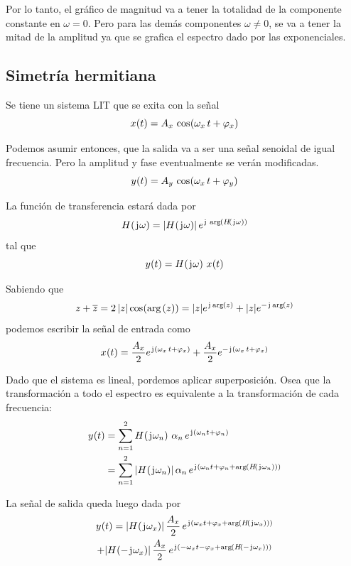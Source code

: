 Por lo tanto, el gráfico de magnitud va a tener la totalidad de la componente constante en $\omega = 0$.
Pero para las demás componentes $\omega \neq 0$, se va a tener la mitad de la amplitud ya que se grafica el espectro dado por las exponenciales.

\subsection{Simetría hermitiana}

Se tiene un sistema LIT que se exita con la señal
\[
    \fx[x]{t} = A_x \, \fx[\cos]{\omega_x \, t + \varphi_x}
\]

Podemos asumir entonces, que la salida va a ser una señal senoidal de igual frecuencia.
Pero la amplitud y fase eventualmente se verán modificadas.
\[
    \fx[y]{t} = A_y \, \fx[\cos]{\omega_x \, t + \varphi_y}
\]

La función de transferencia estará dada por
\[
    \fx[H]{\iu \omega} = \norm{\fx[H]{\iu \omega}} \, e^{\iu \, \fx[\arg]{\fx[H]{\iu \omega}}}
\]
tal que
\[
    \fx[y]{t} = \fx[H]{\iu \omega} \, \fx[x]{t}
\]

Sabiendo que
\[
    z + \conj{z} = 2 \, \norm{z} \fx[\cos]{\fx[\arg]{z}}
    = \norm{z} e^{\iu \fx[\arg]{z}} + \norm{z} e^{- \iu \fx[\arg]{z}}
\]
podemos escribir la señal de entrada como
\[
    \fx[x]{t} = \frac{A_x}{2} e^{\iu \inParentheses{\omega_x \, t + \varphi_x}}
    + \frac{A_x}{2} e^{- \iu \inParentheses{\omega_x \, t + \varphi_x}}
\]

Dado que el sistema es lineal, pordemos aplicar superposición.
Osea que la transformación a todo el espectro es equivalente a la transformación de cada frecuencia:
\begin{align*}
    \fx[y]{t} & = \sum_{\nth=1}^{2} \fx[H]{\iu \omega_\nth}
    \, \alpha_\nth
    \, e^{\iu \inParentheses{\omega_\nth t + \varphi_\nth}}
    \\
    & = \sum_{\nth=1}^{2} \norm{\fx[H]{\iu \omega_\nth}}
    \, \alpha_\nth
    \, e^{\iu \inParentheses{\omega_\nth t + \varphi_\nth + \fx[\arg]{\fx[H]{\iu \omega_\nth}}}}
\end{align*}

La señal de salida queda luego dada por
\begin{multline*}
    \fx[y]{t} = \norm{\fx[H]{\iu \omega_x}}
    \, \frac{A_x}{2}
    \, e^{\iu \inParentheses{\omega_x t + \varphi_x + \fx[\arg]{\fx[H]{\iu \omega_x}}}}
    \\
    + \norm{\fx[H]{- \iu \omega_x}}
    \, \frac{A_x}{2}
    \, e^{\iu \inParentheses{- \omega_x t - \varphi_x + \fx[\arg]{\fx[H]{- \iu \omega_x}}}}
\end{multline*}


